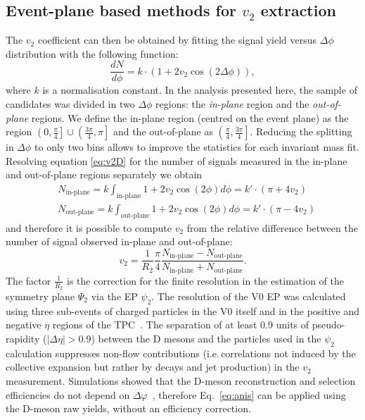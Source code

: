 \subsection{Event-plane based methods for $v_2$ extraction} 
\label{epMethodsDescript}
The $v_2$ coefficient can then be obtained by fitting the signal yield 
versus $\Delta\phi$ distribution with the following function:
\begin{equation}
\label{eq:v2D}
 \frac{dN}{d\phi} = k\cdot(1 + 2v_2\cos(2\Delta\phi)),
\end{equation}
where $k$ is a normalisation constant. 
In the analysis presented here, the sample of candidates was 
divided in two $\Delta\phi$ regions: the \textit{in-plane} region 
and the \textit{out-of-plane} regions. We define the in-plane 
region (centred on the event plane) as the region 
$\left(0,\frac{\pi}{4}\right]\cup\left(\frac{3\pi}{4},\pi\right]$ and
 the out-of-plane as $\left(\frac{\pi}{4},\frac{3\pi}{4}\right]$. 
 Reducing the splitting in $\Delta\phi$ to only two bins allows 
 to improve the statistics for each invariant mass fit. Resolving 
 equation \ref{eq:v2D} for the number of signals measured 
 in the in-plane and out-of-plane regions separately we obtain
\begin{equation}\label{eq:ninout}
 \begin{split}
  & N_\text{in-plane} = k\int_\text{in-plane}1+2v_2\cos(2\phi)d\phi = k'\cdot(\pi+4v_2)\\
  & N_\text{out-plane} = k\int_\text{out-plane}1+2v_2\cos(2\phi)d\phi= k'\cdot(\pi-4v_2)
 \end{split}
\end{equation}
and therefore it is possible to compute $v_2$ from the relative difference between the number of signal observed in-plane and out-of-plane:
\begin{equation}
\label{eq:anis}
 v_2 = \frac{1}{R_2} \frac{\pi}{4}\frac{N_\text{in-plane}-N_\text{out-plane}}{N_\text{in-plane}+N_\text{out-plane}}.
\end{equation}
The factor $\frac{1}{R_2}$ is the correction for the finite resolution in the
estimation of the symmetry plane $\Psi_2$ via the EP $\psi_2$.
The resolution of the V0 EP was calculated using three
sub-events of charged particles in the V0 itself and in the 
positive and negative $\eta$ regions of the TPC~\cite{Poskanzer:1998yz}.
The separation of at least 0.9 units of pseudo-rapidity 
($|\Delta\eta|>0.9$) between the D mesons 
and the particles used in the $\psi_2$ calculation
suppresses non-flow contributions (i.e.\,correlations not 
induced by the collective expansion but rather by decays and 
jet production) in the $v_2$ measurement.
 Simulations showed that the D-meson reconstruction 
 and selection efficiencies do not depend on $\Delta\varphi$~\cite{Abelev:2014ipa}, 
therefore Eq.~\ref{eq:anis} can be applied using the 
D-meson raw yields, without an efficiency correction.

